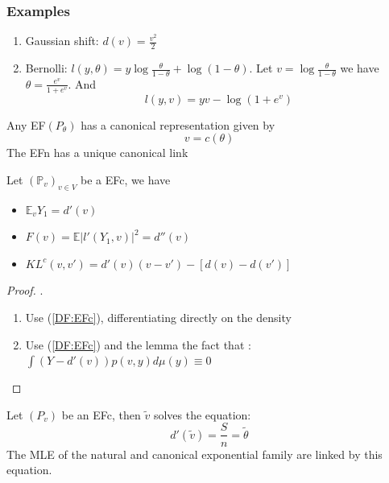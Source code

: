\subsubsection*{Examples}
\begin{enumerate}
	\item Gaussian shift: $d(v)= \frac{v^2}{2}$
	\item Bernolli: $l(y, \theta) = y \log \frac{\theta}{1 - \theta} + \log(1 - \theta)$. Let $v = \log \frac{\theta}{1 - \theta}$ we have $\theta = \frac{e^v}{1 + e^v}$. And 
		\begin{equation*}
			l(y, v) = yv - \log (1 + e^v)
		\end{equation*}
\end{enumerate}

\begin{lemma}
	Any EF$(P_\theta)$ has a canonical representation given by 
	\begin{equation*}
		v = c(\theta)
	\end{equation*}
	The EFn has a unique canonical link
\end{lemma}



\begin{lemma} \label{PP:EFc}
	Let $(\mathbb{P}_v)_{v \in V}$ be a EFc, we have
	\begin{itemize}
		\item $\mathbb{E}_v Y_1 = d'(v)$
		\item $F(v) = \mathbb{E}|l'(Y_1, v)|^2 = d''(v)$
		\item $KL^c(v, v')= d'(v)(v - v') - [d(v) - d(v')]$
	\end{itemize}
\end{lemma}

\begin{proof}.
	\begin{enumerate}
		\item Use (\ref{DF:EFc}), differentiating directly on the density
		\item Use (\ref{DF:EFc}) and the lemma the fact that : $ \int (Y - d'(v)) p(v, y) d\mu(y) \equiv 0$
	\end{enumerate}
\end{proof}

\begin{theorem}
	Let $(P_v)$ be an EFc, then $\tilde{v}$ solves the equation:
	\begin{equation*}
		d'(\tilde{v}) = \frac{S}{n} = \tilde{\theta}
	\end{equation*}
	The MLE of the natural and canonical exponential family are linked by this equation.
\end{theorem}


